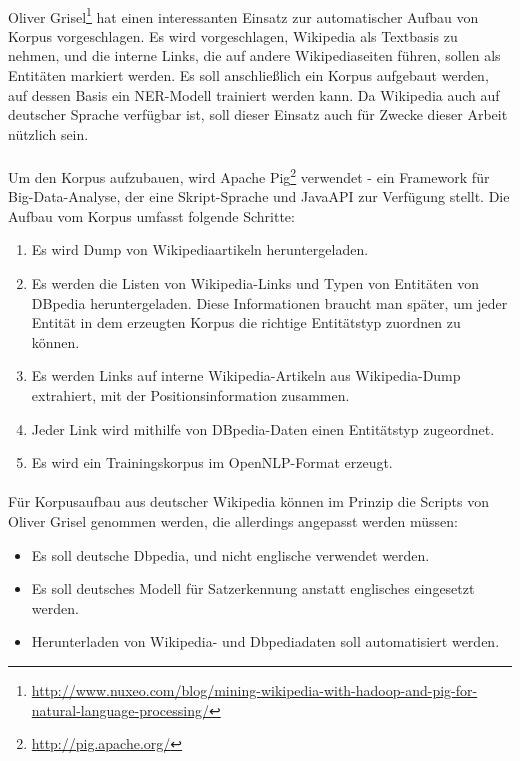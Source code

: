 \paragraph{}
Oliver Grisel\footnote{\url{http://www.nuxeo.com/blog/mining-wikipedia-with-hadoop-and-pig-for-natural-language-processing/}} hat einen interessanten Einsatz zur automatischer Aufbau von Korpus vorgeschlagen. Es wird vorgeschlagen, Wikipedia als Textbasis zu nehmen, und die interne Links, die auf andere Wikipediaseiten führen, sollen als  Entitäten markiert werden. Es soll anschließlich ein Korpus aufgebaut werden, auf dessen Basis ein NER-Modell trainiert werden kann. Da Wikipedia auch auf deutscher Sprache verfügbar ist, soll dieser Einsatz auch für Zwecke dieser Arbeit nützlich sein.

\paragraph{}
Um den Korpus aufzubauen, wird Apache Pig\footnote{\url{http://pig.apache.org/}} verwendet - ein Framework für Big-Data-Analyse, der eine Skript-Sprache und JavaAPI zur Verfügung stellt. Die Aufbau vom Korpus umfasst folgende Schritte:
\begin{enumerate}
\item Es wird Dump von Wikipediaartikeln heruntergeladen.
\item Es werden die Listen von Wikipedia-Links und Typen von Entitäten von DBpedia heruntergeladen. Diese Informationen braucht man später, um jeder Entität in dem erzeugten Korpus die richtige Entitätstyp zuordnen zu können.
\item Es werden Links auf interne Wikipedia-Artikeln aus Wikipedia-Dump extrahiert, mit der Positionsinformation zusammen.
\item Jeder Link wird mithilfe von DBpedia-Daten einen Entitätstyp zugeordnet.
\item Es wird ein Trainingskorpus im OpenNLP-Format erzeugt.
\end{enumerate}

\paragraph{} 
Für Korpusaufbau aus deutscher Wikipedia können im Prinzip die Scripts von Oliver Grisel genommen werden, die allerdings angepasst werden müssen:
\begin{itemize}
\item Es soll deutsche Dbpedia, und nicht englische verwendet werden.
\item Es soll deutsches Modell für Satzerkennung anstatt englisches eingesetzt werden.
\item Herunterladen von Wikipedia- und Dbpediadaten soll automatisiert werden.
\end{itemize}

